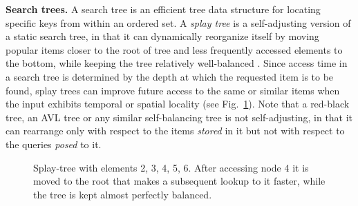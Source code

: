 \noindent%
\textbf{Search trees.} %
A search tree is an efficient tree data structure for locating specific keys from within an ordered set. A \emph{splay tree} is a self-adjusting version of a static search tree, in that it can dynamically reorganize itself by moving popular items closer to the root of tree and less frequently accessed elements to the bottom, while keeping the tree relatively well-balanced \cite{SleatorT85Splay, BoseDL08, Avin0020}. Since access time in a search tree is determined by the depth at which the requested item is to be found, splay trees can improve future access to the same or similar items when the input exhibits temporal or spatial locality (see Fig.~\ref{fig:bst_root_3}).  Note that a red-black tree, an AVL tree or any similar self-balancing tree is not self-adjusting, in that it can rearrange only with respect to the items \emph{stored} in it but not with respect to the queries \emph{posed} to it.

\begin{figure}
 \centering
 \caption{Splay-tree with elements 2, 3, 4, 5, 6. After accessing node 4 it is moved to the root that makes a subsequent lookup to it faster, while the tree is kept almost perfectly balanced.}
 \label{fig:bst_root_3}
\end{figure}

